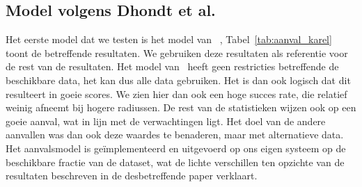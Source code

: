 \subsection{Model volgens Dhondt et al.}
Het eerste model dat we testen is het model van
\citeauthor{Dhondt}~\cite{Dhondt}, Tabel~\ref{tab:aanval_karel} toont de
betreffende resultaten. We gebruiken deze resultaten als referentie voor de
rest van de resultaten. Het model van~\citeauthor{Dhondt} heeft geen
restricties betreffende de beschikbare data, het kan dus alle data gebruiken.
Het is dan ook logisch dat dit resulteert in goeie scores. We zien hier dan ook
een hoge succes rate, die relatief weinig afneemt bij hogere radiussen. De rest
van de statistieken wijzen ook op een goeie aanval, wat in lijn met de
verwachtingen ligt. Het doel van de andere aanvallen was dan ook deze waardes
te benaderen, maar met alternatieve data. Het aanvalsmodel is geïmplementeerd
en uitgevoerd op ons eigen systeem op de beschikbare fractie van de dataset,
wat de lichte verschillen ten opzichte van de resultaten beschreven in de
desbetreffende paper verklaart.

